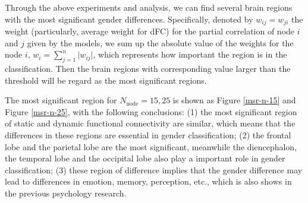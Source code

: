 \documentclass[11pt]{article}
\begin{document}
Through the above experiments and analysis, we can find several brain regions with the most significant gender differences. Specifically, denoted by $w_{ij} = w_{ji}$ the weight (particularly, average weight for dFC) for the partial correlation of node $i$ and $j$ given by the models, we sum up the absolute value of the weights for the node $i$, $w_i = \sum_{j=1}^{n} \vert w_{ij} \vert$, which represents how important the region is in the classification. Then the brain regions with corresponding value larger than the threshold will be regard as the most significant regions.

The most significant region for $N_{\text{node}} = 15, 25$ is shown as Figure \ref{msr-n-15} and Figure \ref{msr-n-25}, with the following conclusions: (1) the most significant region of static and dynamic functional connectivity are similar, which means that the differences in these regions are essential in gender classification; (2) the frontal lobe and the parietal lobe are the most significant, meanwhile the diencephalon, the temporal lobe and the occipital lobe also play a important role in gender classification; (3) these region of difference implies that the gender difference may lead to differences in emotion, memory, perception, etc., which is also shows in the previous psychology research\cite{skaalvik1994gender}\cite{soetanto2006there}\cite{wiesenfeld2005sex}\cite{chaplin2013gender}\cite{fischer2018gender}\cite{guillem2005gender}.
\end{document}
